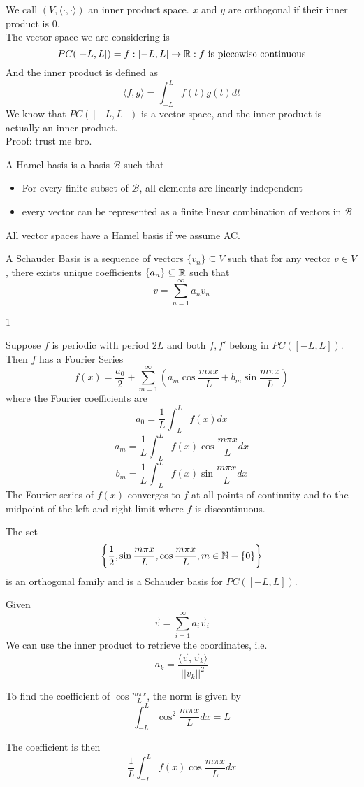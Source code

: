 \documentclass[12pt]{article}
\begin{document}
We call $(V,\langle\cdot,\cdot\rangle)$ an inner product space. $x$ and $y$ are orthogonal if their inner product is $0$. \\
The vector space we are considering is
$$PC([-L,L]) = f:[-L,L]\rightarrow\mathbb{R}: f \text{ is piecewise continuous}$$
And the inner product is defined as
$$\langle f,g\rangle = \int_{-L}^L f(t)\overline{g(t)}dt$$
We know that $PC([-L,L])$ is a vector space, and the inner product is actually an inner product. \\
Proof: trust me bro. \\

\begin{defn}
	A Hamel basis is a basis $\mathcal{B}$ such that
	\begin{itemize}
		\item For every finite subset of $\mathcal{B}$, all elements are linearly independent
		\item every vector can be represented as a finite linear combination of vectors in $\mathcal{B}$
	\end{itemize}
\end{defn}
All vector spaces have a Hamel basis if we assume AC.

\begin{defn}
	A Schauder Basis is a sequence of vectors $\{v_n\} \subseteq V$ such that for any vector $v\in V$, there exists unique coefficients $\{a_n\} \subseteq \mathbb{R}$ such that
$$v = \sum_{n=1}^\infty a_nv_n$$
\end{defn}1

\begin{thm}
	Suppose $f$ is periodic with period $2L$ and both $f,f'$ belong in $PC([-L,L])$. Then $f$ has a Fourier Series
	$$f(x) = \frac{a_0}{2} + \sum_{m=1}^\infty \left(a_m\cos\frac{m\pi x}{L} + b_m\sin\frac{m\pi x}{L}\right)$$
	where the Fourier coefficients are
	$$a_0 = \frac{1}{L}\int_{-L}^L f(x)dx$$
	$$a_m = \frac{1}{L}\int_{-L}^L f(x)\cos\frac{m\pi x}{L}dx$$
	$$b_m = \frac{1}{L}\int_{-L}^L f(x)\sin\frac{m\pi x}{L}dx$$
	The Fourier series of $f(x)$ converges to $f$ at all points of continuity and to the midpoint of the left and right limit where $f$ is discontinuous.
\end{thm}

\begin{thm}
	The set
	$$\left\{\frac{1}{2}, \sin\frac{m\pi x}{L}, \cos\frac{m\pi x}{L}, m \in \mathbb{N}-\{0\}\right\}$$
	is an orthogonal family and is a Schauder basis for $PC([-L,L])$.
\end{thm}

Given
$$\vec{v} = \sum_{i=1}^\infty a_i\vec{v}_i$$
We can use the inner product to retrieve the coordinates, i.e.
$$a_k = \frac{\langle \vec{v},\vec{v}_k\rangle}{||v_k||^2}$$

To find the coefficient of $\cos\frac{m\pi x}{L}$, the norm is given by
$$\int_{-L}^L\cos^2\frac{m\pi x}{L}dx = L$$

The coefficient is then
$$\frac{1}{L}\int_{-L}^{L}f(x)\cos\frac{m\pi x}{L}dx$$
\end{document}
